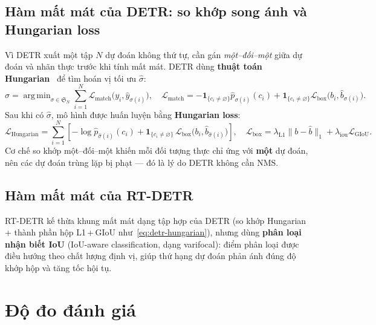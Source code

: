 \documentclass[12pt]{article}
\DeclareMathOperator*{\argmin}{arg\,min}
\numberwithin{equation}{section}
\begin{document}
\subsection{Hàm mất mát của DETR: so khớp song ánh và Hungarian loss}
\label{sec:detr-loss}

Vì DETR xuất một tập $N$ dự đoán không thứ tự, cần gán \textit{một--đối--một} giữa dự đoán và
nhãn thực trước khi tính mất mát. DETR dùng \textbf{thuật toán Hungarian}~\cite{hungarian} để
tìm hoán vị tối ưu $\hat\sigma$:
\begin{equation}
\hat\sigma = \argmin_{\sigma \in \mathfrak{S}_N}
\sum_{i=1}^{N} \mathcal{L}_{\text{match}}\big(y_i, \hat y_{\sigma(i)}\big),
\quad
\mathcal{L}_{\text{match}} =
-\mathbf{1}_{\{c_i \neq \varnothing\}}\hat p_{\sigma(i)}(c_i)
+ \mathbf{1}_{\{c_i \neq \varnothing\}}\mathcal{L}_{\text{box}}\big(b_i, \hat b_{\sigma(i)}\big).
\label{eq:detr-match}
\end{equation}
Sau khi có $\hat\sigma$, mô hình được huấn luyện bằng \textbf{Hungarian loss}:
\begin{equation}
\mathcal{L}_{\text{Hungarian}} =
\sum_{i=1}^{N}\left[
-\log \hat p_{\hat\sigma(i)}(c_i)
+ \mathbf{1}_{\{c_i \neq \varnothing\}}\,\mathcal{L}_{\text{box}}\big(b_i, \hat b_{\hat\sigma(i)}\big)
\right],
\quad
\mathcal{L}_{\text{box}} = \lambda_{\text{L1}}\|b-\hat b\|_1 + \lambda_{\text{iou}}\mathcal{L}_{\text{GIoU}}.
\label{eq:detr-hungarian}
\end{equation}
Cơ chế so khớp một--đối--một khiến mỗi đối tượng thực chỉ ứng với \textbf{một} dự đoán, nên
các dự đoán trùng lặp bị phạt --- đó là lý do DETR không cần NMS.

\subsection{Hàm mất mát của RT-DETR}

RT-DETR kế thừa khung mất mát dạng tập hợp của DETR (so khớp Hungarian + thành phần hộp
L1\,+\,GIoU như~\eqref{eq:detr-hungarian}), nhưng dùng \textbf{phân loại nhận biết IoU}
(IoU-aware classification, dạng varifocal): điểm phân loại được điều hướng theo chất lượng
định vị, giúp thứ hạng dự đoán phản ánh đúng độ khớp hộp và tăng tốc hội tụ.

\section{Độ đo đánh giá}
\end{document}
